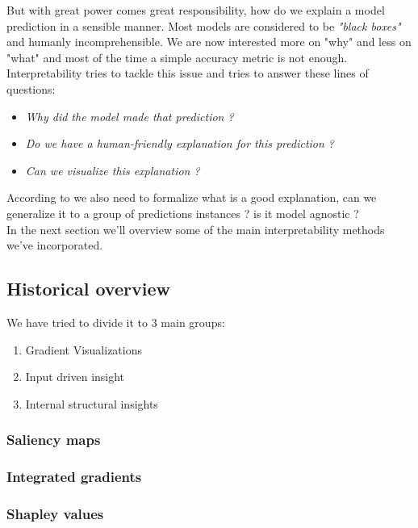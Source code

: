 \documentclass{article}
\begin{document}
But with great power comes great responsibility, how do we explain a model prediction in a sensible manner. Most models are considered to be \textit{"black boxes"} and humanly incomprehensible. We are now interested more on "why" and less on "what" and most of the time a simple accuracy metric is not enough.\\

Interpretability tries to tackle this issue and tries to answer these lines of questions:
\begin{itemize}
	\item \textit{Why did the model made that prediction ?}	
	\item \textit{Do we have a human-friendly explanation for this prediction ?}	
	\item \textit{Can we visualize this explanation ? }	
\end{itemize}


According to \cite{molnar2019} we also need to formalize what is a good explanation, can we generalize it to a group of predictions instances ? is it model agnostic ?\\

In the next section we'll overview some of the main interpretability methods we've incorporated. \\

\newpage
\subsection{Historical overview} 

We have tried to divide it to 3 main groups:
\begin{enumerate}
	\item Gradient Visualizations
	\item Input driven insight
	\item Internal structural insights
\end{enumerate} 

\subsubsection{Saliency maps}

\subsubsection{Integrated gradients}

\subsubsection{Shapley values}
\end{document}
